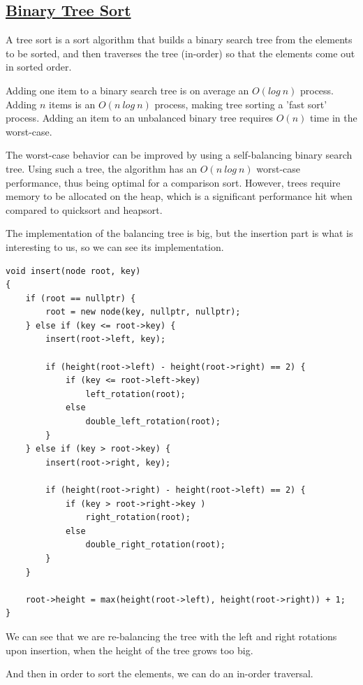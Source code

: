 \documentclass{article}
\begin{document}
\subsection{\underline{Binary Tree Sort}}

A tree sort is a sort algorithm that builds a binary search tree from the elements to be sorted, and then traverses the tree (in-order) so that the elements come out in sorted order.

Adding one item to a binary search tree is on average an $O(log\ n)$ process. Adding $n$ items is an $O(n\ log\ n)$ process, making tree sorting a 'fast sort' process. Adding an item to an unbalanced binary tree requires $O(n)$ time in the worst-case.

The worst-case behavior can be improved by using a self-balancing binary search tree. Using such a tree, the algorithm has an $O(n\ log\ n)$ worst-case performance, thus being optimal for a comparison sort. However, trees require memory to be allocated on the heap, which is a significant performance hit when compared to quicksort and heapsort.

The implementation of the balancing tree is big, but the insertion part is what is interesting to us, so we can see its implementation.

\begin{lstlisting}
void insert(node root, key)
{
    if (root == nullptr) {
        root = new node(key, nullptr, nullptr);
    } else if (key <= root->key) {
        insert(root->left, key);

        if (height(root->left) - height(root->right) == 2) {
            if (key <= root->left->key)
                left_rotation(root);
            else
                double_left_rotation(root);
        }
    } else if (key > root->key) {
        insert(root->right, key);

        if (height(root->right) - height(root->left) == 2) {
            if (key > root->right->key )
                right_rotation(root);
            else
                double_right_rotation(root);
        }
    }

    root->height = max(height(root->left), height(root->right)) + 1;
}
\end{lstlisting}

We can see that we are re-balancing the tree with the left and right rotations upon insertion, when the height of the tree grows too big.

And then in order to sort the elements, we can do an in-order traversal.
\end{document}
